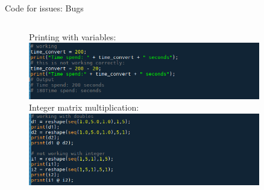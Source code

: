 \documentclass[aspectratio=169]{beamer}
\begin{document}
\begin{frame}[c]{Code for issues: Bugs}
    \begin{figure}
        \begin{columns}[onlytextwidth,t]
            Printing with variables: \\
            \includegraphics[width=0.9\textwidth]{images/I3.png}
            Integer matrix multiplication: \\
            \includegraphics[width=0.9\textwidth]{images/I4.png}
        \end{columns}        
    \end{figure}          
\end{frame}
\end{document}
